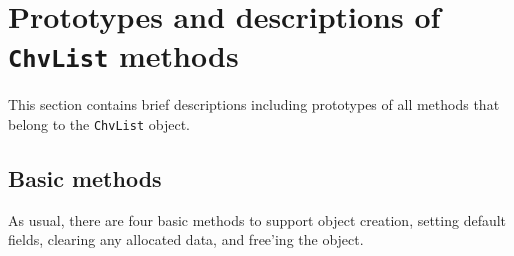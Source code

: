 \par
\section{Prototypes and descriptions of {\tt ChvList} methods}
\label{section:ChvList:proto}
\par
This section contains brief descriptions including prototypes
of all methods that belong to the {\tt ChvList} object.
\par
\subsection{Basic methods}
\label{subsection:ChvList:proto:basics}
\par
As usual, there are four basic methods to support object creation,
setting default fields, clearing any allocated data, and free'ing
the object.
\par
